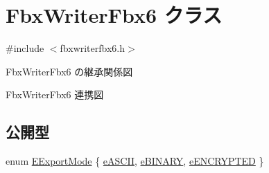 \hypertarget{class_fbx_writer_fbx6}{}\section{Fbx\+Writer\+Fbx6 クラス}
\label{class_fbx_writer_fbx6}


{\ttfamily \#include $<$fbxwriterfbx6.\+h$>$}



Fbx\+Writer\+Fbx6 の継承関係図


Fbx\+Writer\+Fbx6 連携図
\subsection*{公開型}
\begin{DoxyCompactItemize}
\item 
enum \hyperlink{class_fbx_writer_fbx6_a8fd1f1f068e0ba64fe7694877bf15f21}{E\+Export\+Mode} \{ \hyperlink{class_fbx_writer_fbx6_a8fd1f1f068e0ba64fe7694877bf15f21ad381511f67f9345183cd7e0aa72e839a}{e\+A\+S\+C\+II}, 
\hyperlink{class_fbx_writer_fbx6_a8fd1f1f068e0ba64fe7694877bf15f21a852bc8a6a84f0f6957780342811531bb}{e\+B\+I\+N\+A\+RY}, 
\hyperlink{class_fbx_writer_fbx6_a8fd1f1f068e0ba64fe7694877bf15f21a0a6f7a69636978813fe20284108fc656}{e\+E\+N\+C\+R\+Y\+P\+T\+ED}
 \}
\end{DoxyCompactItemize}
